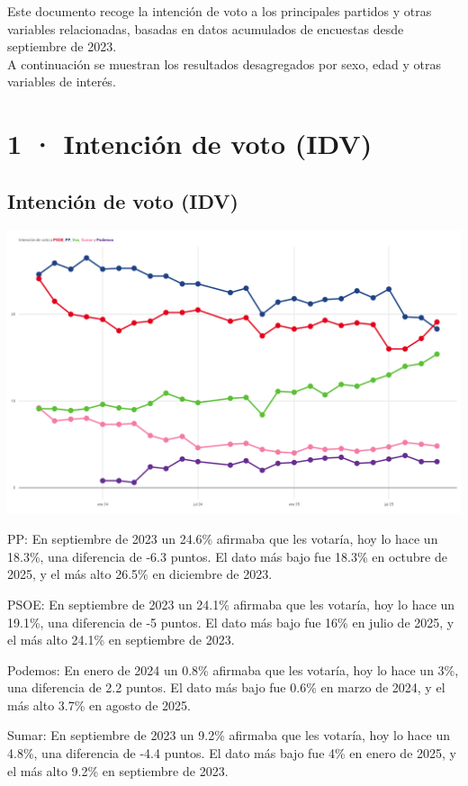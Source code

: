 \documentclass[
  letterpaper,
  DIV=11,
  numbers=noendperiod]{scrreprt}
\begin{document}
Este documento recoge la intención de voto a los principales partidos y
otras variables relacionadas, basadas en datos acumulados de encuestas
desde septiembre de 2023.\\
A continuación se muestran los resultados desagregados por sexo, edad y
otras variables de interés.

\part{1 · Intención de voto (IDV)}

\chapter{Intención de voto (IDV)}\label{intenciuxf3n-de-voto-idv-1}

\includegraphics[width=8in,height=\textheight,keepaspectratio]{figures/p_idv_static.png}

{PP}: En septiembre de 2023 un 24.6\% afirmaba que les votaría, hoy lo
hace un 18.3\%, una diferencia de -6.3 puntos. El dato más bajo fue
18.3\% en octubre de 2025, y el más alto 26.5\% en diciembre de 2023.

{PSOE}: En septiembre de 2023 un 24.1\% afirmaba que les votaría, hoy lo
hace un 19.1\%, una diferencia de -5 puntos. El dato más bajo fue 16\%
en julio de 2025, y el más alto 24.1\% en septiembre de 2023.

{Podemos}: En enero de 2024 un 0.8\% afirmaba que les votaría, hoy lo
hace un 3\%, una diferencia de 2.2 puntos. El dato más bajo fue 0.6\% en
marzo de 2024, y el más alto 3.7\% en agosto de 2025.

{Sumar}: En septiembre de 2023 un 9.2\% afirmaba que les votaría, hoy lo
hace un 4.8\%, una diferencia de -4.4 puntos. El dato más bajo fue 4\%
en enero de 2025, y el más alto 9.2\% en septiembre de 2023.
\end{document}
